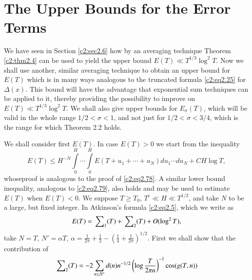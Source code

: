 \section{The Upper Bounds for the Error Terms}\label{c2:sec2.7}

We have seen in Section \ref{c2:sec2.6} how by an averaging technique
Theorem \ref{c2:thm2.4} can be used to yield the upper bound $E(T) \ll
T^{1/3} \log ^2T$. Now we shall use another, similar averaging
technique to obtain an upper bound for $E(T)$ which is in many ways
analogous to the truncated formula \eqref{c2:eq2.25} for $\Delta 
(x)$. This bound will have the advantage that exponential sum
techniques can be applied to it, thereby providing the possibility to
improve on $E(T)\ll T^{1/3} \log^2 T$. We shall also give upper bounds
for $E_\sigma(T)$, which will be valid in the whole range $1/2 <
\sigma < 1$, and not just for $1/2 < \sigma < 3/4$, which is the range
for which Theorem 2.2 holds.

We shall consider first $E(T)$. In case $E(T)> 0$ we start from the
inequality 
\begin{equation}
  E(T) \leq H^{-N} \int\limits_0^H \cdots \int\limits_0^H E(T+ u_1 +
  \cdots + u_N) du_1 \cdots du_N + CH \log T,\label{c2:eq2.103}
\end{equation}
whose\pageoriginale proof is analogous to the proof of
\eqref{c2:eq2.78}. A similar lower bound inequality, analogous to
\eqref{c2:eq2.79}, also holds and may be used to estimate $E(T)$ when
$E(T)< 0$. We suppose $T\geq T_0$, $T^\epsilon \ll H \ll T^{1/2}$, and
take $N$ to be a large, but fixed integer. In Atkinson's formula
\eqref{c2:eq2.5}, which we write as
$$
E(T) = \sideset{}{_1}\sum (T) + \sideset{}{_2}\sum (T) + O(\log^2 T),
$$  
take $N= T$, $N' = \alpha T$, $\alpha = \frac{1}{2 \pi}+ \frac{1}{2} -
\left(\frac{1}{4} + \frac{1}{2 \pi} \right)^{1/2}$. First we shall
show that the contribution of 
$$
\sideset{}{_2}\sum (T) = -2 \sum_{n \leq N'} d(n) n^{-1/2} \left(\log
\frac{T}{2 \pi n} \right)^{-1} \cos (g(T, n))
$$ 

